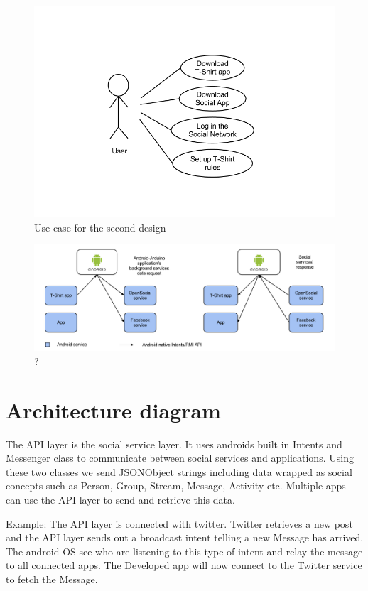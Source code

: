 \begin{figure}[h!]
\centering \includegraphics[scale=0.35]{img/architecture-usecase2.png}
\caption{Use case for the second design}
\label{fig:use-case2}
\end{figure}

\begin{figure}[h!]
\centering \includegraphics[scale=0.35]{img/architecture-reqresp.png}
\caption{?}
\label{fig:reqresp}
\end{figure}

\newpage
\section{Architecture diagram}


The API layer is the social service layer. It uses androids built in Intents and Messenger class to communicate between social services and applications. Using these two classes we send JSONObject strings including data wrapped as social concepts such as Person, Group, Stream, Message, Activity etc. Multiple apps can use the API layer to send and retrieve this data.

Example:
The API layer is connected with twitter. Twitter retrieves a new post and the API layer sends out
a broadcast intent telling a new Message has arrived. The android OS see who are listening to this type of intent and relay the message to all connected apps. The Developed app will now connect to the Twitter service to fetch the Message. 

